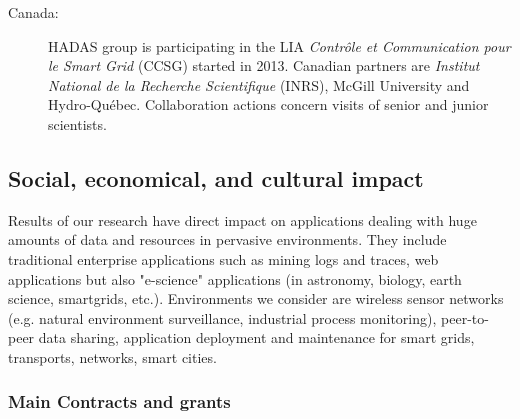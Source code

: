\begin{description}
\item[Canada:]
HADAS group is participating in the LIA {\em Contrôle et Communication pour le Smart Grid} (CCSG) started in 2013. Canadian partners are {\em Institut National de la Recherche Scientifique} (INRS), McGill University and Hydro-Qu\'ebec. Collaboration actions concern visits of senior and junior scientists.

\end{description}


\subsection{Social, economical, and cultural impact} %
\label{sub:hadas_social_economical_and_cultural_impact}

Results of our research have direct impact on applications dealing with huge amounts of data and resources in pervasive environments. 
They include traditional enterprise applications such as mining logs and traces, web applications but also "e-science" applications (in astronomy, biology, earth science, smartgrids, etc.). 
Environments we consider are wireless sensor networks (e.g. natural environment surveillance, industrial process monitoring), peer-to-peer data sharing, application deployment and maintenance for smart grids, transports, networks, smart cities.  

\subsubsection{Main Contracts and grants}


